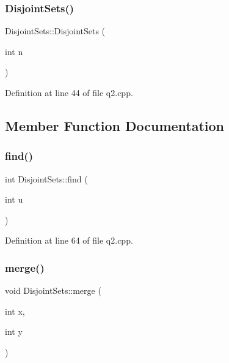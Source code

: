 \subsubsection{\texorpdfstring{Disjoint\+Sets()}{DisjointSets()}}
{\footnotesize\ttfamily Disjoint\+Sets\+::\+Disjoint\+Sets (\begin{DoxyParamCaption}\item[{int}]{n }\end{DoxyParamCaption})\hspace{0.3cm}{\ttfamily [inline]}}



Definition at line 44 of file q2.\+cpp.



\subsection{Member Function Documentation}
\mbox{\label{struct_disjoint_sets_a14ff5306079945dd59c0c6d55129ac2e}} 
\subsubsection{\texorpdfstring{find()}{find()}}
{\footnotesize\ttfamily int Disjoint\+Sets\+::find (\begin{DoxyParamCaption}\item[{int}]{u }\end{DoxyParamCaption})\hspace{0.3cm}{\ttfamily [inline]}}



Definition at line 64 of file q2.\+cpp.

\mbox{\label{struct_disjoint_sets_a349af3d249271920c355d9ef2a641f87}} 
\subsubsection{\texorpdfstring{merge()}{merge()}}
{\footnotesize\ttfamily void Disjoint\+Sets\+::merge (\begin{DoxyParamCaption}\item[{int}]{x,  }\item[{int}]{y }\end{DoxyParamCaption})\hspace{0.3cm}{\ttfamily [inline]}}



